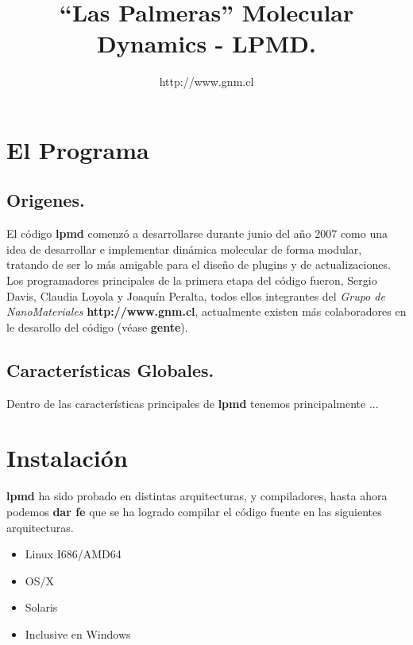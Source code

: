 \documentclass[a4paper,10pt]{scrbook}
\newcommand{\lpmd}{\textbf{lpmd }}
\begin{document}
\author{http://www.gnm.cl}
\title{``Las Palmeras'' Molecular Dynamics - \textbf{LPMD}.}
\maketitle

\tableofcontents
\chapter{El Programa}
\label{chap:lpmd}

\section{Origenes.}

El c\'odigo \lpmd comenz\'o a desarrollarse durante junio del a\~no 2007 como una idea de desarrollar e implementar din\'amica molecular de forma modular, tratando de ser lo m\'as amigable para el dise\~no de plugins y de actualizaciones. Los programadores principales de la primera etapa del c\'odigo fueron, Sergio Davis, Claudia Loyola y Joaqu\'in Peralta, todos ellos integrantes del \textit{Grupo de NanoMateriales} \textbf{http://www.gnm.cl}, actualmente existen m\'as colaboradores en le desarollo del c\'odigo (v\'ease \textbf{gente}).

\section{Caracter\'isticas Globales.}

Dentro de las caracter\'isticas principales de \lpmd tenemos principalmente ...

\chapter{Instalaci\'on}
\label{chap:inst}

\lpmd ha sido probado en distintas arquitecturas, y compiladores, hasta ahora podemos \textbf{dar fe} que se ha logrado compilar el c\'odigo fuente en las siguientes arquitecturas.

\begin{itemize}
 \item Linux I686/AMD64
 \item OS/X
 \item Solaris
 \item Inclusive en Windows
\end{itemize}
\end{document}
